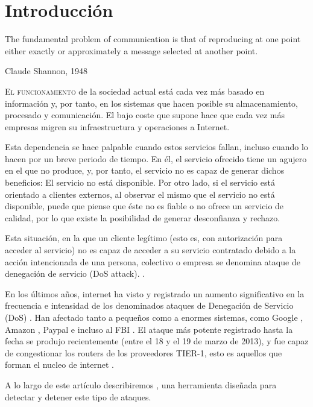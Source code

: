 \chapter{Introducción}\label{introduccion}
\epigraph{The fundamental problem of communication is that of reproducing at one point either 
exactly or approximately a message selected at another point.}{Claude Shannon, 1948}

\lettrine[lraise=-0.1, lines=2, loversize=0.2]{E}{l funcionamiento} de la sociedad actual está cada vez más basado en 
información y, por tanto, en los sistemas que hacen posible su almacenamiento, procesado y comunicación. El bajo coste 
que supone hace que cada vez más empresas migren su infraestructura y operaciones a Internet.

Esta dependencia se hace palpable cuando estos servicios fallan, incluso cuando lo hacen por un breve periodo de tiempo. 
En él, el servicio ofrecido tiene un agujero en el que no produce, y, por tanto, el servicio no es capaz de generar 
dichos beneficios: El servicio no está disponible. Por otro lado, si el servicio está orientado a clientes externos, al 
observar el mismo que el servicio no está disponible, puede que piense que éste no es fiable o no ofrece un servicio 
de calidad, por lo que existe la posibilidad de generar desconfianza y rechazo.

Esta situación, en la que un cliente legítimo (esto es, con autorización para acceder al servicio) no es capaz de 
acceder a su servicio contratado debido a la acción intencionada de una persona, colectivo o empresa se denomina ataque 
de denegación de servicio (DoS attack). \cite{Raghavan}.

En los últimos años, internet ha visto y registrado un aumento significativo en la frecuencia e intensidad de los 
denominados ataques de Denegación de Servicio (DoS) \cite{kakaspersky_2H2011_DDoS_analisis}. Han afectado tanto a 
pequeños como a enormes sistemas, como Google \cite{Google+_DDoS_attack}, Amazon \cite{Amazon_DDoS_attack}, Paypal 
e incluso al FBI \cite{FBI_DDoS_attack}. El ataque más potente registrado hasta la fecha se produjo recientemente (entre 
el 18 y el 19 de marzo de 2013), y fue capaz de congestionar los routers de los proveedores TIER-1, esto es aquellos que 
forman el nucleo de internet \cite{spamhaus_DDoS_attack}. 

A lo largo de este artículo describiremos \redborderddos, una herramienta diseñada 
para detectar y detener este tipo de ataques.


\endinput
